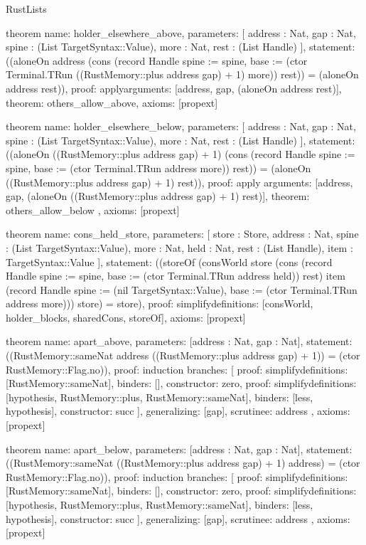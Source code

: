 \begin{lexlean}{RustLists}
\begin{semanticmodule}
theorem{
  name: holder_elsewhere_above,
  parameters: [
    address : Nat,
    gap : Nat,
    spine : (List TargetSyntax::Value),
    more : Nat,
    rest : (List Handle)
  ],
  statement: ((aloneOn address (cons (record Handle {spine := spine, base := (ctor Terminal.TRun ((RustMemory::plus address gap) + 1) more)}) rest)) = (aloneOn address rest)),
  proof: apply{arguments: [address, gap, (aloneOn address rest)], theorem: others_allow_above},
  axioms: [propext]
}

theorem{
  name: holder_elsewhere_below,
  parameters: [
    address : Nat,
    gap : Nat,
    spine : (List TargetSyntax::Value),
    more : Nat,
    rest : (List Handle)
  ],
  statement: ((aloneOn ((RustMemory::plus address gap) + 1) (cons (record Handle {spine := spine, base := (ctor Terminal.TRun address more)}) rest)) = (aloneOn ((RustMemory::plus address gap) + 1) rest)),
  proof: apply{
    arguments: [address, gap, (aloneOn ((RustMemory::plus address gap) + 1) rest)],
    theorem: others_allow_below
  },
  axioms: [propext]
}

theorem{
  name: cons_held_store,
  parameters: [
    store : Store,
    address : Nat,
    spine : (List TargetSyntax::Value),
    more : Nat,
    held : Nat,
    rest : (List Handle),
    item : TargetSyntax::Value
  ],
  statement: ((storeOf (consWorld store (cons (record Handle {spine := spine, base := (ctor Terminal.TRun address held)}) rest) item (record Handle {spine := (nil TargetSyntax::Value), base := (ctor Terminal.TRun address more)})) store) = store),
  proof: simplify{definitions: [consWorld, holder_blocks, sharedCons, storeOf]},
  axioms: [propext]
}

theorem{
  name: apart_above,
  parameters: [address : Nat, gap : Nat],
  statement: ((RustMemory::sameNat address ((RustMemory::plus address gap) + 1)) = (ctor RustMemory::Flag.no)),
  proof: induction{
    branches: [
      {proof: simplify{definitions: [RustMemory::sameNat]}, binders: [], constructor: zero},
      {
        proof: simplify{definitions: [hypothesis, RustMemory::plus, RustMemory::sameNat]},
        binders: [less, hypothesis],
        constructor: succ
      }
    ],
    generalizing: [gap],
    scrutinee: address
  },
  axioms: [propext]
}

theorem{
  name: apart_below,
  parameters: [address : Nat, gap : Nat],
  statement: ((RustMemory::sameNat ((RustMemory::plus address gap) + 1) address) = (ctor RustMemory::Flag.no)),
  proof: induction{
    branches: [
      {proof: simplify{definitions: [RustMemory::sameNat]}, binders: [], constructor: zero},
      {
        proof: simplify{definitions: [hypothesis, RustMemory::plus, RustMemory::sameNat]},
        binders: [less, hypothesis],
        constructor: succ
      }
    ],
    generalizing: [gap],
    scrutinee: address
  },
  axioms: [propext]
}


\end{semanticmodule}
\end{lexlean}
